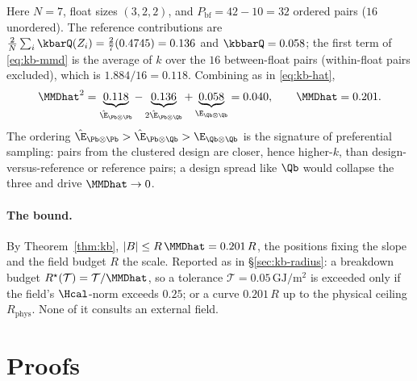 Here $N=7$, float sizes $(3,2,2)$, and $P_{\mathrm{bf}}=42-10=32$ ordered pairs
($16$ unordered). The reference contributions are
$\tfrac{2}{N}\sum_i\kbarQ(Z_i)=\tfrac27(0.4745)=0.136$ and $\kbbarQ=0.058$; the
first term of \eqref{eq:kb-mmd} is the average of $k$ over the $16$ between-float
pairs (within-float pairs excluded), which is $1.884/16=0.118$. Combining as in
\eqref{eq:kb-hat},
\[
  \MMDhat^{2}
  =\underbrace{0.118}_{\hat\E_{\Pb\otimes\Pb}}
  -\underbrace{0.136}_{2\hat\E_{\Pb\otimes\Qb}}
  +\underbrace{0.058}_{\E_{\Qb\otimes\Qb}}
  =0.040,
  \qquad
  \MMDhat=0.201 .
\]
The ordering $\hat\E_{\Pb\otimes\Pb}>\hat\E_{\Pb\otimes\Qb}>\E_{\Qb\otimes\Qb}$ is
the signature of preferential sampling: pairs from the clustered design are closer,
hence higher-$k$, than design-versus-reference or reference pairs; a design spread
like $\Qb$ would collapse the three and drive $\MMDhat\to0$.

\paragraph{The bound.}
By Theorem~\ref{thm:kb}, $|B|\le R\,\MMDhat=0.201\,R$, the positions fixing the
slope and the field budget $R$ the scale. Reported as in \S\ref{sec:kb-radius}: a
breakdown budget $R^{\star}(\mathcal T)=\mathcal T/\MMDhat$, so a tolerance
$\mathcal T=0.05\,\mathrm{GJ/m^2}$ is exceeded only if the field's $\Hcal$-norm
exceeds $0.25$; or a curve $0.201\,R$ up to the physical ceiling
$R_{\mathrm{phys}}$. None of it consults an external field.

\appendix
\section{Proofs}
\label{app:proofs}
\printdeferredproofs

